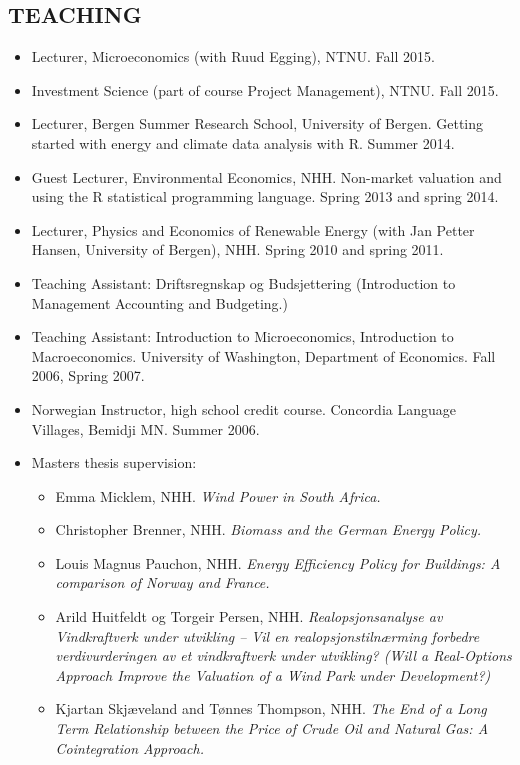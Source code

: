 \documentclass[margin]{res}
\begin{document}
\begin{resume}
\section{TEACHING} 
\begin{itemize}
\setlength{\itemsep}{10pt}
\item[] Lecturer, Microeconomics (with Ruud Egging), NTNU.  Fall 2015.
\item[] Investment Science (part of course Project Management), NTNU.  Fall 2015.
\item[] Lecturer, Bergen Summer Research School, University of Bergen.  Getting started with energy and climate data analysis with R.  Summer 2014.
\item[] Guest Lecturer, Environmental Economics, NHH.  Non-market valuation and using the R statistical programming language.  Spring 2013 and spring 2014.
\item[] Lecturer, Physics and Economics of Renewable Energy (with Jan Petter Hansen, University of Bergen), NHH.  Spring 2010 and spring 2011.
\item[] Teaching Assistant: Driftsregnskap og Budsjettering (Introduction to Management Accounting and Budgeting.)
\item[] Teaching Assistant: Introduction to Microeconomics, Introduction to Macroeconomics.  University of Washington, Department of Economics. Fall 2006, Spring 2007.
\item[] Norwegian Instructor, high school credit course.  Concordia Language Villages, Bemidji MN.  Summer 2006.  
\item [] Masters thesis supervision:
  \begin{itemize}
  \item[] Emma Micklem, NHH. \emph{Wind Power in South Africa.}
  \item[] Christopher Brenner, NHH. \emph{Biomass and the German Energy Policy.}
  \item[] Louis Magnus Pauchon, NHH. \emph{Energy Efficiency Policy for Buildings: A comparison of Norway and France.}
  \item[] Arild Huitfeldt og Torgeir Persen, NHH.  \emph{Realopsjonsanalyse av Vindkraftverk under utvikling – Vil en realopsjonstiln\ae rming forbedre verdivurderingen av et vindkraftverk under utvikling? (Will a Real-Options Approach Improve the Valuation of a Wind Park under Development?)}
  \item[] Kjartan Skj\ae veland and T\o nnes Thompson, NHH. \emph{The End of a Long Term Relationship between the Price of Crude Oil and Natural Gas: A Cointegration Approach.} 

\end{itemize}
\end{itemize}
\end{resume}
\end{document}
